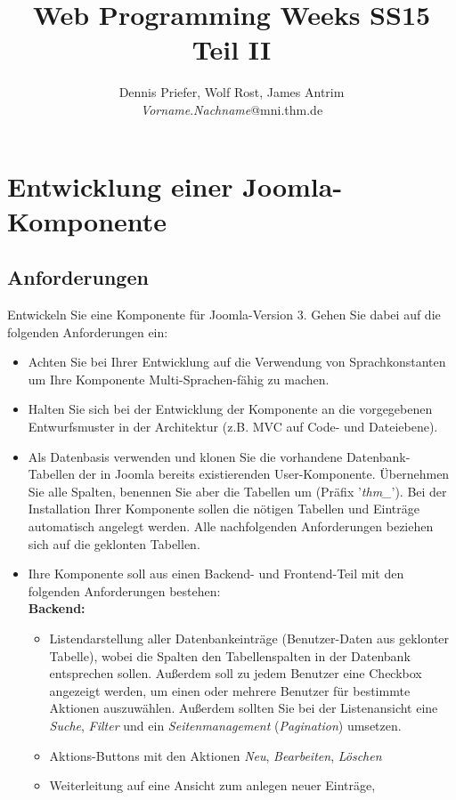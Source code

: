 \documentclass[]{article}
\title{Web Programming Weeks SS15\\ Teil II}
\author{Dennis Priefer, Wolf Rost, James Antrim\\\textit{Vorname}.\textit{Nachname}@mni.thm.de}
\begin{document}
\maketitle

\section{Entwicklung einer Joomla-Komponente}
\subsection{Anforderungen}
Entwickeln Sie eine Komponente für Joomla-Version 3. Gehen Sie dabei auf die folgenden Anforderungen ein:
\begin{itemize}
	\item Achten Sie bei Ihrer Entwicklung auf die Verwendung von Sprachkonstanten um Ihre Komponente Multi-Sprachen-fähig zu machen.
	\item Halten Sie sich bei der Entwicklung der Komponente an die vorgegebenen Entwurfsmuster in der Architektur (z.B. MVC auf Code- und Dateiebene).
	\item Als Datenbasis verwenden und klonen Sie die vorhandene Datenbank-Tabellen der in Joomla bereits existierenden User-Komponente. Übernehmen Sie alle Spalten, benennen Sie aber die Tabellen um (Präfix '\textit{thm\_}'). Bei der Installation Ihrer Komponente sollen die nötigen Tabellen und Einträge automatisch angelegt werden. Alle nachfolgenden Anforderungen beziehen sich auf die geklonten Tabellen.
	\item Ihre Komponente soll aus einen Backend- und Frontend-Teil mit den folgenden Anforderungen bestehen:\\
	\textbf{Backend:}
	\begin{itemize}
		\item Listendarstellung aller Datenbankeinträge (Benutzer-Daten aus geklonter Tabelle), wobei die Spalten den Tabellenspalten in der Datenbank entsprechen sollen. Außerdem soll zu jedem Benutzer eine Checkbox angezeigt werden, um einen oder mehrere Benutzer für bestimmte Aktionen auszuwählen. Außerdem sollten Sie bei der Listenansicht eine \textit{Suche}, \textit{Filter} und ein \textit{Seitenmanagement} (\textit{Pagination}) umsetzen.
		\item Aktions-Buttons mit den Aktionen \textit{Neu}, \textit{Bearbeiten}, \textit{Löschen}
		\item Weiterleitung auf eine Ansicht zum anlegen neuer Einträge, 
		\begin{itemize}

\end{itemize}
\end{itemize}
\end{itemize}
\end{document}
